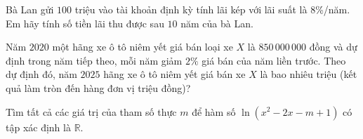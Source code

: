 \begin{bt}%
	Bà Lan gửi $100$ triệu vào tài khoản định kỳ tính lãi kép với lãi suất là $8$\%/năm. Em hãy tính số tiền lãi thu được sau $10$ năm của bà Lan.
\end{bt}

\begin{ex}%
	Năm $2020$ một hãng xe ô tô niêm yết giá bán loại xe $X$ là $850\,000\,000$ đồng và dự định trong năm tiếp theo, mỗi năm giảm $2\%$ giá bán của năm liền trước. Theo dự định đó, năm $2025$ hãng xe ô tô niêm yết giá bán xe $X$ là bao nhiêu triệu (kết quả làm tròn đến hàng đơn vị triệu đồng)? 
\end{ex}

\begin{bt}%
	Tìm tất cả các giá trị của tham số thực $m$ để hàm số $\ln\left(x^2-2x-m+1\right)$ có tập xác định là $\mathbb{R}$.
\end{bt}

